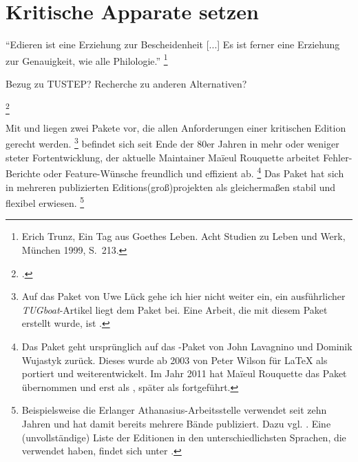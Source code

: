 \chapter{Kritische Apparate setzen}

 
\label{reledmac}

\enquote{Edieren ist eine Erziehung zur Bescheidenheit [...] Es ist ferner eine Erziehung zur 
Genauigkeit, wie alle Philologie.}%
\footnote{Erich Trunz, Ein Tag aus Goethes Leben. Acht Studien zu Leben und Werk, München 1999, S.~213.}

Bezug zu TUSTEP?
Recherche zu anderen Alternativen?

\footcite[165\psqq]{rouquette:2012}

\cite{stockhausen:welten}

Mit  und  liegen zwei Pakete vor, die allen Anforderungen einer kritischen Edition gerecht werden.%
\footnote{%
	Auf das Paket  von Uwe Lück gehe ich hier nicht weiter ein, ein ausführlicher \textsl{TUGboat}-Artikel liegt dem Paket bei. Eine Arbeit, die mit diesem Paket erstellt wurde, ist \cite{mariev:joh_ant}.}
 befindet sich seit Ende der 80er Jahren in mehr oder weniger steter Fortentwicklung, der aktuelle Maintainer Maïeul Rouquette arbeitet Fehler-Berichte oder Feature-Wünsche freundlich und effizient ab.%
\footnote{%
	Das Paket  \cite{reledmac} geht ursprünglich auf das -Paket  von John Lavagnino und Dominik Wujastyk zurück. Dieses wurde ab 2003 von Peter Wilson für \LaTeX{} als  portiert und weiterentwickelt. Im Jahr 2011 hat Maïeul Rouquette das Paket übernommen und erst als , später als  fortgeführt.}
Das Paket hat sich in mehreren publizierten Editions(groß)projekten als gleichermaßen stabil und flexibel erwiesen.%
\footnote{%
	Beispielsweise die Erlanger Athanasius-Arbeitsstelle verwendet seit zehn Jahren  und hat damit bereits mehrere Bände publiziert. Dazu vgl. \cite{stockhausen:welten}. Eine (unvollständige) Liste der Editionen in den unterschiedlichsten Sprachen, die  verwendet haben, findet sich unter \cite{reledmac-benutzung}.}